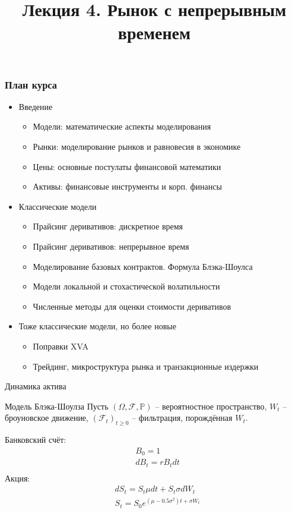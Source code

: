 \documentclass{beamer}
\title[Модель Блэка-Шоулза]{Лекция 4. Рынок с непрерывным временем} %
\begin{document}
\begin{frame}
\titlepage 
\end{frame}

\begin{frame}
\frametitle{План курса} 
\begin{itemize} 
    \item Введение
    \begin{itemize}
        \item Модели: математические аспекты моделирования
        \item Рынки: моделирование рынков и равновесия в экономике
        \item Цены: основные постулаты финансовой математики
        \item Активы: финансовые инструменты и корп. финансы
    \end{itemize}
    \item Классические модели
    \begin{itemize}
        \item Прайсинг деривативов: дискретное время 
        \item Прайсинг деривативов: непрерывное время
        \item Моделирование базовых контрактов. Формула Блэка-Шоулса
        \item Модели локальной и стохастической волатильности
        \item Численные методы для оценки стоимости деривативов
    \end{itemize}
    \item Тоже классические модели, но более новые
    \begin{itemize}
        \item Поправки XVA
        \item Трейдинг, микроструктура рынка и транзакционные издержки
    \end{itemize}
\end{itemize}
\end{frame}

\begin{frame}
  \centering
\Large Динамика актива
\end{frame}

\begin{frame}{Модель Блэка-Шоулза}
    Пусть $(\Omega, \mathcal{F}, \mathbb{P})$ -- вероятностное пространство, $W_t$ -- броуновское движение, $(\mathcal{F}_t)_{t\geq 0}$ -- фильтрация, порождённая $W_t$. 
    \pause
    
    Банковский счёт:
    \begin{align*}
        &B_0 = 1 \\
        &dB_t = r B_t dt\\
    \end{align*}
    \pause
    Акция:
    \begin{align*}
        &dS_t = S_t \mu dt + S_t \sigma dW_t \\
        &S_t = S_0 e^{ \left(\mu - 0.5 \sigma^2 \right) t + \sigma W_t}
    \end{align*}
\end{frame}
\end{document}
